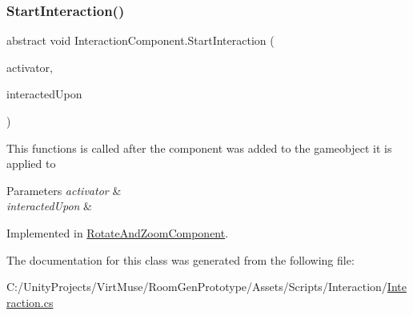 \subsubsection{\texorpdfstring{Start\+Interaction()}{StartInteraction()}}
{\footnotesize\ttfamily abstract void Interaction\+Component.\+Start\+Interaction (\begin{DoxyParamCaption}\item[{Game\+Object}]{activator,  }\item[{Game\+Object}]{interacted\+Upon }\end{DoxyParamCaption})\hspace{0.3cm}{\ttfamily [pure virtual]}}



This functions is called after the component was added to the gameobject it is applied to 


\begin{DoxyParams}{Parameters}
{\em activator} & \\
\hline
{\em interacted\+Upon} & \\
\hline
\end{DoxyParams}


Implemented in \mbox{\hyperlink{class_rotate_and_zoom_component_ac6afb9569858cf59c584c7bdfac41def}{Rotate\+And\+Zoom\+Component}}.



The documentation for this class was generated from the following file\+:\begin{DoxyCompactItemize}
\item 
C\+:/\+Unity\+Projects/\+Virt\+Muse/\+Room\+Gen\+Prototype/\+Assets/\+Scripts/\+Interaction/\mbox{\hyperlink{_interaction_8cs}{Interaction.\+cs}}\end{DoxyCompactItemize}
